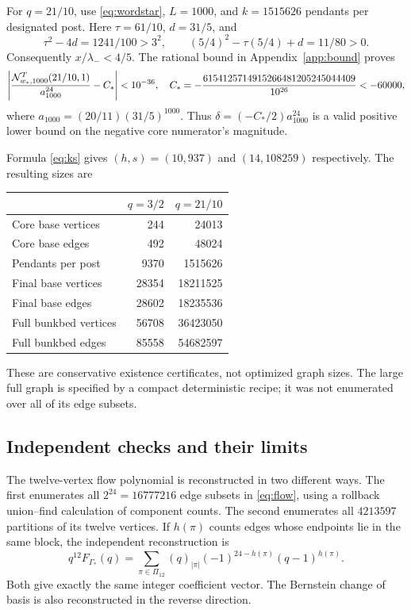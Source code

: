 \documentclass[11pt,a4paper]{article}
\theoremstyle{remark}\newtheorem{remark}[theorem]{Remark}
\begin{document}
For $q=21/10$, use \eqref{eq:wordstar}, $L=1000$, and $k=1515626$ pendants per designated post. Here $\tau=61/10$, $d=31/5$, and
\[
\tau^2-4d=1241/100>3^2,
\qquad (5/4)^2-\tau(5/4)+d=11/80>0.
\]
Consequently $x/\lambda_-<4/5$. The rational bound in Appendix~\ref{app:bound} proves
\begin{equation}\label{eq:finitegap}
\left|\frac{\mathcal N_{w_*,1000}^{T}(21/10,1)}{a_{1000}^{24}}-C_*\right|<10^{-36},
\quad
C_*=-\frac{6154125714915266481205245044409}{10^{26}}<-60000,
\end{equation}
where $a_{1000}=(20/11)(31/5)^{1000}$. Thus
$\delta=(-C_*/2)a_{1000}^{24}$ is a valid positive lower bound on the negative core numerator's magnitude.

Formula \eqref{eq:ks} gives $(h,s)=(10,937)$ and $(14,108259)$ respectively. The resulting sizes are
\begin{center}
\begin{tabular}{lrr}
\toprule
 & $q=3/2$ & $q=21/10$\\
\midrule
Core base vertices & 244 & 24013\\
Core base edges & 492 & 48024\\
Pendants per post & 9370 & 1515626\\
Final base vertices & 28354 & 18211525\\
Final base edges & 28602 & 18235536\\
Full bunkbed vertices & 56708 & 36423050\\
Full bunkbed edges & 85558 & 54682597\\
\bottomrule
\end{tabular}
\end{center}
These are conservative existence certificates, not optimized graph sizes. The large full graph is specified by a compact deterministic recipe; it was not enumerated over all of its edge subsets.

\subsection{Independent checks and their limits}
The twelve-vertex flow polynomial is reconstructed in two different ways. The first enumerates all $2^{24}=16777216$ edge subsets in \eqref{eq:flow}, using a rollback union--find calculation of component counts. The second enumerates all $4213597$ partitions of its twelve vertices. If $h(\pi)$ counts edges whose endpoints lie in the same block, the independent reconstruction is
\begin{equation}\label{eq:partitionflow}
q^{12}F_{\Gamma_*}(q)=\sum_{\pi\in\Pi_{12}}(q)_{|\pi|}
(-1)^{24-h(\pi)}(q-1)^{h(\pi)}.
\end{equation}
Both give exactly the same integer coefficient vector. The Bernstein change of basis is also reconstructed in the reverse direction.
\end{document}
